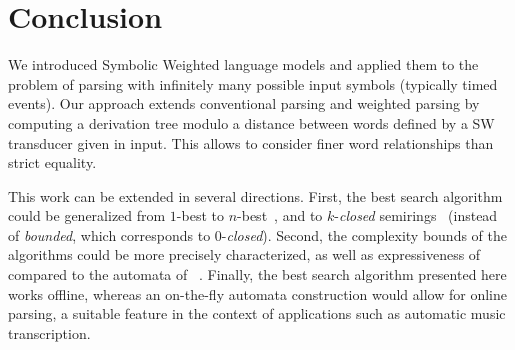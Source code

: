 \section*{Conclusion}

We  introduced Symbolic Weighted language models %
and applied them to the problem of parsing
with infinitely many possible input symbols (typically timed events).
Our approach extends conventional parsing and weighted parsing
by computing a derivation tree modulo
a distance between words
defined by a SW transducer given in input.
This allows to consider finer word relationships than strict equality.
%

This work can be extended in several directions. First, 
the best search algorithm could be generalized from $1$-best to $n$-best~\cite{Huang05kbest},
and to $k$-\emph{closed} semirings~\cite{Mohri02semiring}
(instead of \emph{bounded}, which corresponds to $0$-\emph{closed}). Second,
the complexity bounds of the algorithms could be more precisely characterized,
as well as expressiveness of \swM compared to the automata of 
\eg~\cite{Segoufin06csl,KaminskiFrancez94,NevenSchwentickVianu04FSMinfinite,Bojanczyk11FO2}.
Finally, the  best search algorithm presented here works offline, whereas
an on-the-fly automata construction would allow for online parsing,
a suitable feature in the context of applications such as 
\eg automatic music transcription.


\newpage


%
%
%






\newpage
\appendix

